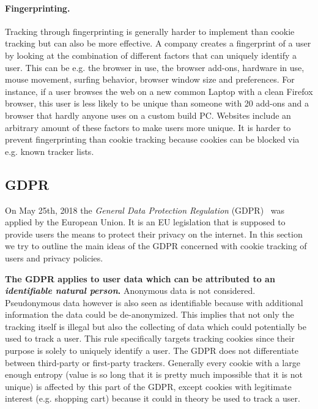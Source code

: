 \paragraph{Fingerprinting.}

Tracking through fingerprinting is generally harder to implement than cookie tracking but can also be more effective. A company
creates a fingerprint of a user by looking at the combination of different factors that can uniquely identify a user. This can
be e.g. the browser in use, the browser add-ons, hardware in use, mouse movement, surfing behavior, browser window size
and preferences. For instance, if a user browses the web on a new common Laptop with a clean Firefox browser, this user is less
likely to be unique than someone with 20 add-ons and a browser that hardly anyone uses on a custom build PC.
Websites include an arbitrary amount of these factors to make users more unique. It is harder to prevent fingerprinting
than cookie tracking because cookies can be blocked via e.g. known tracker lists.


\subsection{GDPR}

On May 25th, 2018 the \emph{General Data Protection Regulation} (GDPR)~\cite{EUdataregulations2018} was applied by the European Union. It is an EU
legislation that is supposed to provide users the means to protect their privacy on the internet. In this section we try
to outline the main ideas of the GDPR concerned with cookie tracking of users and privacy policies.

\textbf{The GDPR applies to user data which can be attributed to an \emph{identifiable natural person}.}
Anonymous data is not considered. Pseudonymous data however is also seen as identifiable because with additional information
the data could be de-anonymized. This implies that not only the tracking itself is illegal but also the collecting of data
which could potentially be used to track a user. This rule specifically targets tracking cookies since their purpose is
solely to uniquely identify a user. The GDPR does not differentiate between third-party or first-party trackers.
Generally every cookie with a large enough entropy (value is so long that it is pretty much impossible that it is not
unique) is affected by this part of the GDPR, except cookies with legitimate interest (e.g. shopping cart) because it could in theory be used to track a user.

